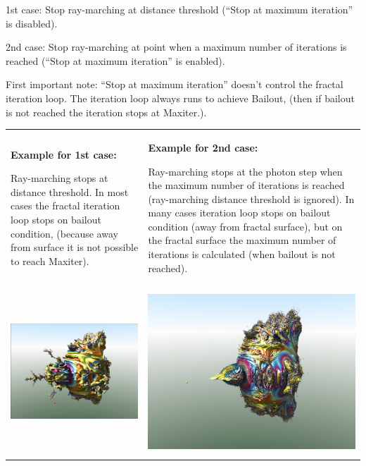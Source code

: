 1st case: Stop ray-marching at distance threshold (``Stop at maximum
iteration'' is disabled).

\protect\hypertarget{__DdeLink__1111_813559202}{}{}2nd case: Stop
ray-marching at point when a maximum number of iterations is reached
(``Stop at maximum iteration'' is enabled).

First important note: ``Stop at maximum iteration'' doesn't control the
fractal iteration loop. The iteration loop always runs to achieve
Bailout, (then if bailout is not reached the iteration stops at
Maxiter.).

\begin{longtable}[]{@{}ll@{}}
\toprule
\textbf{Example for 1st case:}

Ray-marching stops at distance threshold. In most cases the fractal
iteration loop stops on bailout condition, (because away from surface it
is not possible to reach Maxiter). & \textbf{Example for 2nd case:}

Ray-marching stops at the photon step when the maximum number of
iterations is reached (ray-marching distance threshold is ignored). In
many cases iteration loop stops on bailout condition (away from fractal
surface), but on the fractal surface the maximum number of iterations is
calculated (when bailout is not reached).\tabularnewline
\includegraphics[width=3.22795in,height=2.40000in]{img/manual/media/image8.png}
&
\includegraphics[width=3.26890in,height=2.44016in]{img/manual/media/image9.png}\tabularnewline
\bottomrule
\end{longtable}

